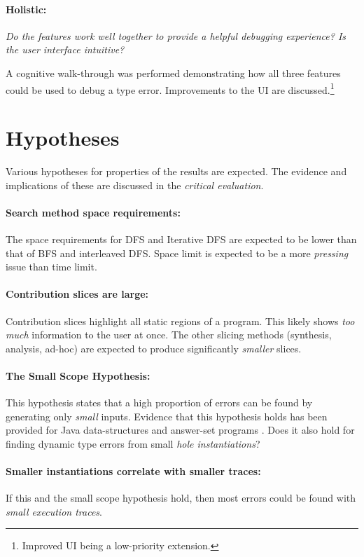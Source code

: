 \paragraph{Holistic: } \textit{Do the features work well together to provide a helpful debugging experience? Is the user interface intuitive?}

A cognitive walk-through was performed demonstrating how all three features could be used to debug a type error. Improvements to the UI are discussed.\footnote{Improved UI being a low-priority extension.} 



\section{Hypotheses}
Various hypotheses for properties of the results are expected. The evidence and implications of these are discussed in the \textit{critical evaluation}.

\paragraph{Search method space requirements: } The space requirements for DFS and Iterative DFS are expected to be lower than that of BFS and interleaved DFS. Space limit is expected to be a more \textit{pressing} issue than time limit.

\paragraph{Contribution slices are large: } Contribution slices highlight all static regions of a program. This likely shows \textit{too much} information to the user at once. The other slicing methods (synthesis, analysis, ad-hoc) are expected to produce significantly \textit{smaller} slices. 

\paragraph{The Small Scope Hypothesis: } This hypothesis states that a high proportion of errors can be found by generating only \textit{small} inputs. Evidence that this hypothesis holds has been provided for Java data-structures \cite{SmallScopeHypothesis} and answer-set programs \cite{SmallScopeHypothesisAnswerSet}. Does it also hold for finding dynamic type errors from small \textit{hole instantiations}?

\paragraph{Smaller instantiations correlate with smaller traces: } If this and the small scope hypothesis hold, then most errors could be found with \textit{small execution traces}.

